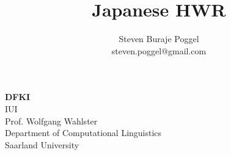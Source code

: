 \title{Japanese HWR}
\author{Steven Buraje Poggel\\
steven.poggel@gmail.com}

%

\maketitle

\begin{center}
\textbf{DFKI} \\
IUI \\
Prof. Wolfgang Wahlster \\
Department of Computational Linguistics\\
Saarland University
\end{center}

\thispagestyle{empty}
\newpage
\textsc{ }
\thispagestyle{empty}
\newpage


%
\thispagestyle{empty}
\tableofcontents

\newpage

\textsc{ }
%
%
\thispagestyle{empty}

\newpage

%

\fontsize{11pt}{13}\selectfont
